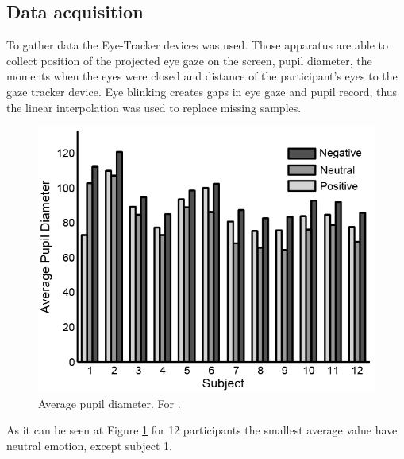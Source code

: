 \documentclass[10pt,journal,compsoc,twoside]{IEEEtran}
\newcommand{\Ref}[2]{#2 \ref{#1}}
\begin{document}
\subsection{Data acquisition}
To gather data the Eye-Tracker devices was used. Those apparatus are able to collect position of the projected eye gaze on the screen, pupil diameter, the moments when the eyes were closed and distance of the participant's eyes to the gaze tracker device. Eye blinking creates gaps in eye gaze and pupil record, thus the linear interpolation was used to replace missing samples.
\begin{figure}[ht]
	\centering
	\includegraphics[width=1.0\linewidth]{pupilDiameter1}
	\caption{Average pupil diameter. For \cite{WeiLongBoNanBaoLiang2014}.}
	\label{fig:pupilSize1}
\end{figure}
\newline
As it can be seen at \Ref{fig:pupilSize1}{Figure} for 12 participants the smallest average value have neutral emotion, except subject 1.
\end{document}
